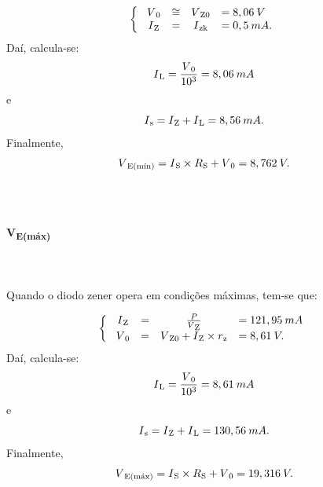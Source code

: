 \documentclass[journal, a4paper]{IEEEtran}
\begin{document}
         \begin{equation}\label{condições mínimas zener}
            \left\{\begin{array}{cccl}
            \ V\textsubscript{0}&\cong&V\textsubscript{Z0}&=8,06\: V\\
            \  I\textsubscript{Z}&=&I\textsubscript{zk}&=0,5 \: mA.
            \end{array}\right. 
            \end{equation}
    \tab Daí, calcula-se: 
        \begin{equation}
            I\textsubscript{L} = \frac{V\textsubscript{0}}{10\textsuperscript{3}} = 8,06 \:mA
        \end{equation}
    e 
        \begin{equation}
            I\textsubscript{s} = I\textsubscript{Z} + I\textsubscript{L} = 8,56\: mA.
        \end{equation}
    Finalmente, 
        \begin{equation}
            V\textsubscript{E(mín)} = I\textsubscript{S} \times R\textsubscript{S} + V\textsubscript{0} = 8,762 \:V.
        \end{equation}
\\~\\    
    
    \paragraph{V\textsubscript{E(máx)}}
\\~\\
     \tab Quando o diodo zener opera em condições máximas, tem-se que:
     
         \begin{equation}\label{condições máximas zener}
            \left\{\begin{array}{cccl}
            \ I\textsubscript{Z}&=&\frac{P}{V\textsubscript{Z}}&=121,95 \: mA\\
            \ V\textsubscript{0}&=&V\textsubscript{Z0} + I\textsubscript{Z} \times r\textsubscript{z}&=8,61 \:V.
            \end{array}\right. 
            \end{equation}
    \tab Daí, calcula-se: 
         \begin{equation}
            I\textsubscript{L} = \frac{V\textsubscript{0}}{10\textsuperscript{3}} = 8,61 \:mA
        \end{equation}
    e 
        \begin{equation}
            I\textsubscript{s} = I\textsubscript{Z} + I\textsubscript{L} = 130,56 \:mA.
        \end{equation}
    Finalmente, 
        \begin{equation}
            V\textsubscript{E(máx)} = I\textsubscript{S} \times R\textsubscript{S} + V\textsubscript{0} = 19,316 \:V.
        \end{equation}    
    
\end{document}
